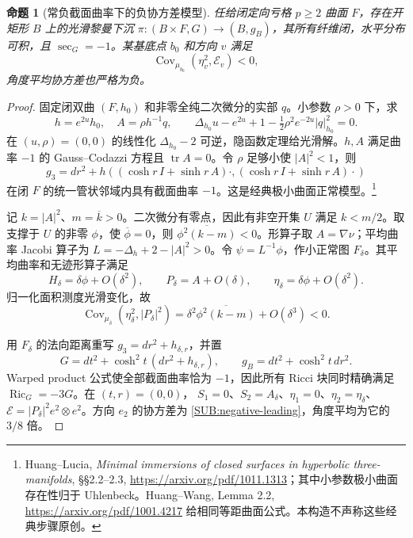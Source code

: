 \documentclass[UTF8,fontset=fandol,zihao=-4,oneside,openany]{ctexbook}
\theoremstyle{cjkplain}
\newtheorem{proposition}[theorem]{命题}
\numberwithin{equation}{chapter}
\begin{document}
\begin{proposition}[常负截面曲率下的负协方差模型]\label{SUB:negative-covariance}
任给闭定向亏格 $p\ge2$ 曲面 $F$，存在开矩形 $B$ 上的光滑黎曼下沉
$\pi:(B\times F,G)\to(B,g_B)$，其所有纤维闭，水平分布可积，且 $\sec_G=-1$。某基底点 $b_0$ 和方向 $v$ 满足
\[
\operatorname{Cov}_{\mu_{b_0}}(\eta_v^2,\mathcal E_v)<0,
\]
角度平均协方差也严格为负。
\end{proposition}
\begin{proof}
固定闭双曲 $(F,h_0)$ 和非零全纯二次微分的实部 $q$。小参数 $\rho>0$ 下，求
\[
h=e^{2u}h_0,\quad A=\rho h^{-1}q,\qquad
\Delta_{h_0}u-e^{2u}+1-\tfrac12\rho^2e^{-2u}|q|_{h_0}^2=0.
\]
在 $(u,\rho)=(0,0)$ 的线性化 $\Delta_{h_0}-2$ 可逆，隐函数定理给光滑解。$h,A$ 满足曲率 $-1$ 的 Gauss--Codazzi 方程且 $\operatorname{tr}A=0$。令 $\rho$ 足够小使 $|A|^2<1$，则
\[
g_3=dr^2+h((\cosh r\,I+\sinh r\,A)\cdot,
                 (\cosh r\,I+\sinh r\,A)\cdot)
\]
在闭 $F$ 的统一管状邻域内具有截面曲率 $-1$。这是经典极小曲面正常模型。\footnote{Huang--Lucia, \emph{Minimal immersions of closed surfaces in hyperbolic three-manifolds}, §§2.2--2.3, \url{https://arxiv.org/pdf/1011.1313}；其中小参数极小曲面存在性归于 Uhlenbeck。Huang--Wang, Lemma 2.2, \url{https://arxiv.org/pdf/1001.4217} 给相同等距曲面公式。本构造不声称这些经典步骤原创。}

记 $k=|A|^2$、$m=\overline k>0$。二次微分有零点，因此有非空开集 $U$ 满足 $k<m/2$。取支撑于 $U$ 的非零 $\phi$，使 $\overline\phi=0$，则
$\overline{\phi^2(k-m)}<0$。形算子取 $A=\nabla\nu$；平均曲率 Jacobi 算子为
$L=-\Delta_h+2-|A|^2>0$。令 $\psi=L^{-1}\phi$，作小正常图 $F_\delta$。其平均曲率和无迹形算子满足
\[
H_\delta=\delta\phi+O(\delta^2),\qquad
P_\delta=A+O(\delta),\qquad
\eta_\delta=\delta\phi+O(\delta^2).
\]
归一化面积测度光滑变化，故
\begin{equation}\label{SUB:negative-leading}
\operatorname{Cov}_{\mu_\delta}(\eta_\delta^2,|P_\delta|^2)
=\delta^2\overline{\phi^2(k-m)}+O(\delta^3)<0.
\end{equation}

用 $F_\delta$ 的法向距离重写 $g_3=dr^2+h_{\delta,r}$，并置
\[
G=dt^2+\cosh^2t\,(dr^2+h_{\delta,r}),\qquad
 g_B=dt^2+\cosh^2t\,dr^2.
\]
Warped product 公式使全部截面曲率恰为 $-1$，因此所有 Ricci 块同时精确满足 $\operatorname{Ric}_G=-3G$。在 $(t,r)=(0,0)$，
$S_1=0$、$S_2=A_\delta$、$\eta_1=0$、$\eta_2=\eta_\delta$、
$\mathcal E=|P_\delta|^2e^2\otimes e^2$。方向 $e_2$ 的协方差为 \eqref{SUB:negative-leading}，角度平均为它的 $3/8$ 倍。
\end{proof}
\end{document}
